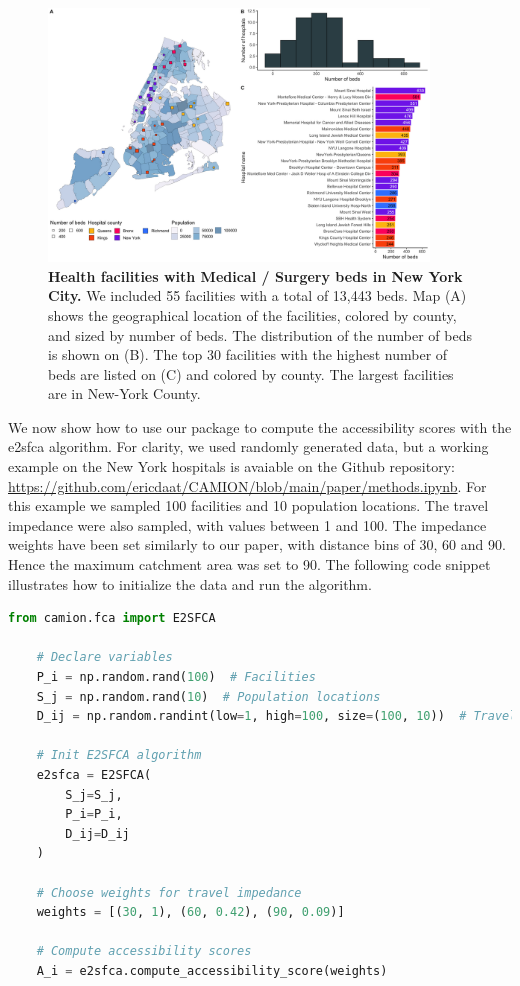 \begin{figure}[H]
    \includegraphics[width=0.9\textwidth]{images/camion-ny/fig1.png}
    \centering
    \caption{ \textbf{Health facilities with Medical / Surgery beds in New York
            City.} We included 55 facilities with a total of 13,443 beds. Map (A)
        shows the geographical location of the facilities, colored by county,
        and sized by number of beds. The distribution of the number of beds is
        shown on (B). The top 30 facilities with the highest number of beds are
        listed on (C) and colored by county. The largest facilities are in
        New-York County. }
    \label{fig:camion-ny-beds}
\end{figure}

We now show how to use our package to compute the accessibility scores with
the \ac{e2sfca} algorithm. For clarity, we used randomly generated data,
but a working example on the New York hospitals is avaiable on the Github
repository: \url{https://github.com/ericdaat/CAMION/blob/main/paper/methods.ipynb}.
For this example we sampled 100 facilities and 10 population locations. The
travel impedance were also sampled, with values between 1 and 100. The impedance
weights have been set similarly to our paper, with distance bins of 30, 60 and
90. Hence the maximum catchment area was set to 90. The following code snippet
illustrates how to initialize the data and run the algorithm.

\begin{minipage}{\textwidth}
    \begin{lstlisting}[language=Python, caption=Compute accessibility score with \ac{e2sfca}]
    from camion.fca import E2SFCA

    # Declare variables
    P_i = np.random.rand(100)  # Facilities
    S_j = np.random.rand(10)  # Population locations
    D_ij = np.random.randint(low=1, high=100, size=(100, 10))  # Travel impedance

    # Init E2SFCA algorithm
    e2sfca = E2SFCA(
        S_j=S_j,
        P_i=P_i,
        D_ij=D_ij
    )

    # Choose weights for travel impedance
    weights = [(30, 1), (60, 0.42), (90, 0.09)]

    # Compute accessibility scores
    A_i = e2sfca.compute_accessibility_score(weights)
    \end{lstlisting}
\end{minipage}


